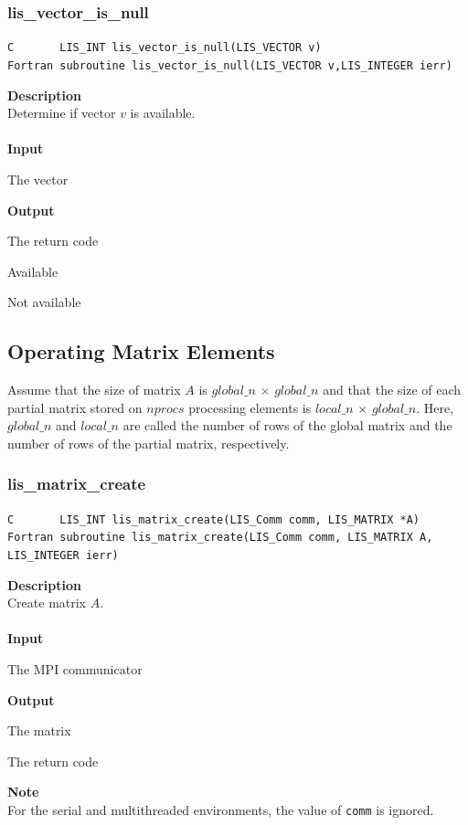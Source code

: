 \documentclass[a4paper]{article}
\newcommand{\namelistlabel}[1]{\mbox{#1}\hfill}
\newenvironment{namelist}[1]{%
\begin{list}{}
  {\let\makelabel\namelistlabel
  \settowidth{\labelwidth}{#1}
  \setlength{\leftmargin}{1.1\labelwidth}}
  }{%
\end{list}}
\begin{document}
\subsubsection{lis\_vector\_is\_null}
\begin{screen}
\verb|C       LIS_INT lis_vector_is_null(LIS_VECTOR v)|\\
\verb|Fortran subroutine lis_vector_is_null(LIS_VECTOR v,LIS_INTEGER ierr)|
\end{screen}
{\bf Description}\\
\indent
Determine if vector $v$ is available. 
\\ \\
\noindent
{\bf Input}
\begin{namelist}{XXXXXXXXXXXXXXXXXXXX}
\item[\tt v] The vector
\end{namelist}
{\bf Output}
\begin{namelist}{XXXXXXXXXXXXXXXXXXXX}
\item[\tt ierr] The return code
\begin{namelist}{XXXXXXXXXXXXXXXXXXXX}
\item[\tt LIS\_TRUE] Available
\item[\tt LIS\_FALSE] Not available  
\end{namelist}
\end{namelist}

\newpage
\subsection{Operating Matrix Elements}
Assume that the size of matrix $A$ is $global\_n$ $\times$ $global\_n$
and that the size of each partial matrix stored on $nprocs$ 
processing elements is $local\_n$ $\times$ $global\_n$. Here, $global\_n$
and $local\_n$ are called the number of rows of the global matrix
and the number of rows of the partial matrix, respectively. 
\subsubsection{lis\_matrix\_create}
\begin{screen}
\verb|C       LIS_INT lis_matrix_create(LIS_Comm comm, LIS_MATRIX *A)|
\verb|Fortran subroutine lis_matrix_create(LIS_Comm comm, LIS_MATRIX A, LIS_INTEGER ierr)|
\end{screen}
{\bf Description}\\
\indent
Create matrix $A$.
\\ \\
\noindent
{\bf Input}
\begin{namelist}{XXXXXXXXXXXXXXXXXXXX}
\item[\tt comm] The MPI communicator
\end{namelist}
{\bf Output}
\begin{namelist}{XXXXXXXXXXXXXXXXXXXX}
\item[\tt A] The matrix
\item[\tt ierr] The return code
\end{namelist}
{\bf Note}\\
\indent
For the serial and multithreaded environments, the value of {\tt comm} is ignored. 
\end{document}
